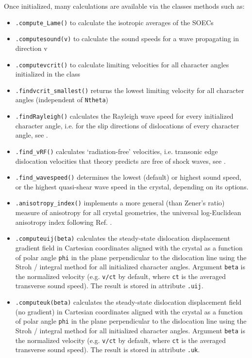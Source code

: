 \documentclass[11pt,letterpaper,oneside,pdftex]{article}
\begin{document}
Once initialized, many calculations are available via the classes methods such as:
\begin{itemize}
\item \verb|.compute_Lame()| to calculate the isotropic averages of the SOECs

\item \verb|.computesound(v)| to calculate the sound speeds for a wave propagating in direction v

\item \verb|.computevcrit()| to calculate limiting velocities for all character angles initialized in the class

\item \verb|.findvcrit_smallest()| returns the lowest limiting velocity for all character angles (independent of \verb|Ntheta|)

\item \verb|.findRayleigh()| calculates the Rayleigh wave speed for every initialized character angle, i.e. for the slip directions of dislocations of every character angle, see \cite{Barnett:1973b}.

\item \verb|.find_vRF()| calculates `radiation-free' velocities, i.e. transonic edge dislocation velocities that theory predicts are free of shock waves, see \cite{Gao:1999,Blaschke:2023rad}.

\item \verb|.find_wavespeed()| determines the lowest (default) or highest sound speed, or the highest quasi-shear wave speed in the crystal, depending on its options.

\item \verb|.anisotropy_index()| implements a more general (than Zener's ratio) measure of anisotropy for all crystal geometries, the universal log-Euclidean anisotropy index following Ref. \cite{Kube:2016anis}.

\item \verb|.computeuij(beta)| calculates the steady-state dislocation displacement gradient field in Cartesian coordinates aligned with the crystal as a function of polar angle \verb|phi| in the plane perpendicular to the dislocation line using the Stroh / integral method \cite{Bacon:1980} for all initialized character angles.
Argument \verb|beta| is the normalized velocity (e.g. \verb|v/ct| by default, where \verb|ct| is the averaged transverse sound speed).
The result is stored in attribute \verb|.uij|.

\item \verb|.computeuk(beta)| calculates the steady-state dislocation displacement field (no gradient) in Cartesian coordinates aligned with the crystal as a function of polar angle \verb|phi| in the plane perpendicular to the dislocation line using the Stroh / integral method \cite{Bacon:1980} for all initialized character angles.
Argument \verb|beta| is the normalized velocity (e.g. \verb|v/ct| by default, where \verb|ct| is the averaged transverse sound speed).
The result is stored in attribute \verb|.uk|.


\end{itemize}
\end{document}
